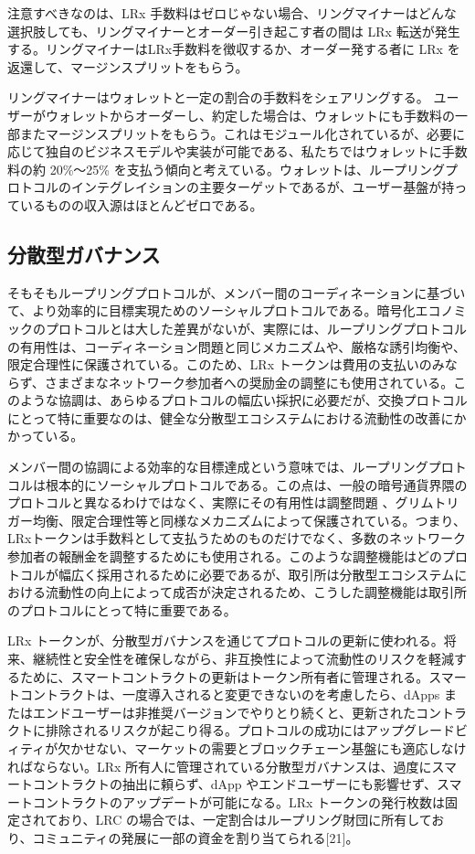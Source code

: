 \documentclass{article}
\begin{document}
\begin{multicols}{2}
注意すべきなのは、LRx 手数料はゼロじゃない場合、リングマイナーはどんな選択肢しても、リングマイナーとオーダー引き起こす者の間は LRx 転送が発生する。リングマイナーはLRx手数料を徴収するか、オーダー発する者に LRx を返還して、マージンスプリットをもらう。

リングマイナーはウォレットと一定の割合の手数料をシェアリングする。 ユーザーがウォレットからオーダーし、約定した場合は、ウォレットにも手数料の一部またマージンスプリットをもらう。これはモジュール化されているが、必要に応じて独自のビジネスモデルや実装が可能である、私たちではウォレットに手数料の約 20\%〜25\% を支払う傾向と考えている。ウォレットは、ループリングプロトコルのインテグレイションの主要ターゲットであるが、ユーザー基盤が持っているものの収入源はほとんどゼロである。

\subsection{分散型ガバナンス}

そもそもループリングプロトコルが、メンバー間のコーディネーションに基づいて、より効率的に目標実現ためのソーシャルプロトコルである。暗号化エコノミックのプロトコルとは大した差異がないが、実際には、ループリングプロトコルの有用性は、コーディネーション問題と同じメカニズムや、厳格な誘引均衡や、限定合理性に保護されている。このため、LRx トークンは費用の支払いのみならず、さまざまなネットワーク参加者への奨励金の調整にも使用されている。このような協調は、あらゆるプロトコルの幅広い採択に必要だが、交換プロトコルにとって特に重要なのは、健全な分散型エコシステムにおける流動性の改善にかかっている。

メンバー間の協調による効率的な目標達成という意味では、ループリングプロトコルは根本的にソーシャルプロトコルである。この点は、一般の暗号通貨界隈のプロトコルと異なるわけではなく、実際にその有用性は調整問題 \cite{vitalikgovernance}、グリムトリガー均衡、限定合理性等と同様なメカニズムによって保護されている。つまり、LRxトークンは手数料として支払うためのものだけでなく、多数のネットワーク参加者の報酬金を調整するためにも使用される。このような調整機能はどのプロトコルが幅広く採用されるために必要であるが、取引所は分散型エコシステムにおける流動性の向上によって成否が決定されるため、こうした調整機能は取引所のプロトコルにとって特に重要である。

LRx トークンが、分散型ガバナンスを通じてプロトコルの更新に使われる。将来、継続性と安全性を確保しながら、非互換性によって流動性のリスクを軽減するために、スマートコントラクトの更新はトークン所有者に管理される。スマートコントラクトは、一度導入されると変更できないのを考慮したら、dApps またはエンドユーザーは非推奨バージョンでやりとり続くと、更新されたコントラクトに排除されるリスクが起こり得る。プロトコルの成功にはアップグレードビィティが欠かせない、マーケットの需要とブロックチェーン基盤にも適応しなければならない。LRx 所有人に管理されている分散型ガバナンスは、過度にスマートコントラクトの抽出に頼らず、dApp やエンドユーザーにも影響せず、スマートコントラクトのアップデートが可能になる。LRx トークンの発行枚数は固定されており、LRC の場合では、一定割合はループリング財団に所有しており、コミュニティの発展に一部の資金を割り当てられる[21]。


\end{multicols}
\end{document}
